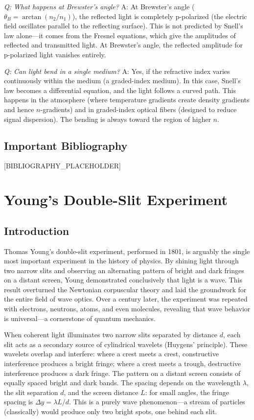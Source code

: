 \documentclass[11pt,openright]{book}
\begin{document}
\textit{Q: What happens at Brewster's angle?}
A: At Brewster's angle ($\theta_B = \arctan(n_2/n_1)$), the reflected light is completely p-polarized (the electric field oscillates parallel to the reflecting surface). This is not predicted by Snell's law alone---it comes from the Fresnel equations, which give the amplitudes of reflected and transmitted light. At Brewster's angle, the reflected amplitude for p-polarized light vanishes entirely.

\textit{Q: Can light bend in a single medium?}
A: Yes, if the refractive index varies continuously within the medium (a graded-index medium). In this case, Snell's law becomes a differential equation, and the light follows a curved path. This happens in the atmosphere (where temperature gradients create density gradients and hence $n$-gradients) and in graded-index optical fibers (designed to reduce signal dispersion). The bending is always toward the region of higher $n$.
\section*{Important Bibliography}

[BIBLIOGRAPHY_PLACEHOLDER]


\chapter{Young's Double-Slit Experiment}

\section*{Introduction}

Thomas Young's double-slit experiment, performed in 1801, is arguably the single most important experiment in the history of physics. By shining light through two narrow slits and observing an alternating pattern of bright and dark fringes on a distant screen, Young demonstrated conclusively that light is a wave. This result overturned the Newtonian corpuscular theory and laid the groundwork for the entire field of wave optics. Over a century later, the experiment was repeated with electrons, neutrons, atoms, and even molecules, revealing that wave behavior is universal---a cornerstone of quantum mechanics.

When coherent light illuminates two narrow slits separated by distance $d$, each slit acts as a secondary source of cylindrical wavelets (Huygens' principle). These wavelets overlap and interfere: where a crest meets a crest, constructive interference produces a bright fringe; where a crest meets a trough, destructive interference produces a dark fringe. The pattern on a distant screen consists of equally spaced bright and dark bands. The spacing depends on the wavelength $\lambda$, the slit separation $d$, and the screen distance $L$: for small angles, the fringe spacing is $\Delta y = \lambda L/d$. This is a purely wave phenomenon---a stream of particles (classically) would produce only two bright spots, one behind each slit.
\end{document}

